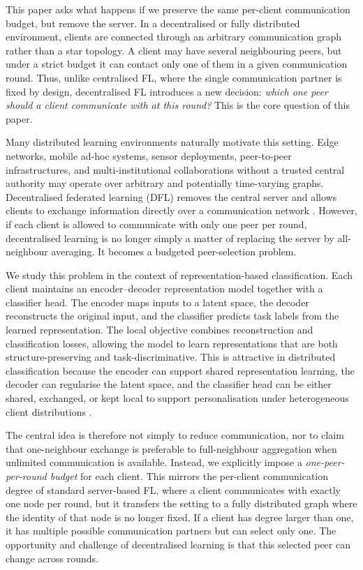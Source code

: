 \documentclass[conference]{IEEEtran}
\begin{document}
This paper asks what happens if we preserve the same per-client communication budget, but remove the server. In a decentralised or fully distributed environment, clients are connected through an arbitrary communication graph rather than a star topology. A client may have several neighbouring peers, but under a strict budget it can contact only one of them in a given communication round. Thus, unlike centralised FL, where the single communication partner is fixed by design, decentralised FL introduces a new decision: \emph{which one peer should a client communicate with at this round?} This is the core question of this paper.

Many distributed learning environments naturally motivate this setting. Edge networks, mobile ad-hoc systems, sensor deployments, peer-to-peer infrastructures, and multi-institutional collaborations without a trusted central authority may operate over arbitrary and potentially time-varying graphs. Decentralised federated learning (DFL) removes the central server and allows clients to exchange information directly over a communication network \cite{yuan2023decentralized}. However, if each client is allowed to communicate with only one peer per round, decentralised learning is no longer simply a matter of replacing the server by all-neighbour averaging. It becomes a budgeted peer-selection problem.

We study this problem in the context of representation-based classification. Each client maintains an encoder--decoder representation model together with a classifier head. The encoder maps inputs to a latent space, the decoder reconstructs the original input, and the classifier predicts task labels from the learned representation. The local objective combines reconstruction and classification losses, allowing the model to learn representations that are both structure-preserving and task-discriminative. This is attractive in distributed classification because the encoder can support shared representation learning, the decoder can regularise the latent space, and the classifier head can be either shared, exchanged, or kept local to support personalisation under heterogeneous client distributions \cite{le2018supervised,chen2023auto,collins2021exploiting}.

The central idea is therefore not simply to reduce communication, nor to claim that one-neighbour exchange is preferable to full-neighbour aggregation when unlimited communication is available. Instead, we explicitly impose a \emph{one-peer-per-round budget} for each client. This mirrors the per-client communication degree of standard server-based FL, where a client communicates with exactly one node per round, but it transfers the setting to a fully distributed graph where the identity of that node is no longer fixed. If a client has degree larger than one, it has multiple possible communication partners but can select only one. The opportunity and challenge of decentralised learning is that this selected peer can change across rounds.
\end{document}

